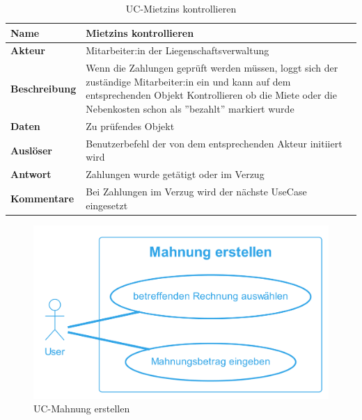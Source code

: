 \vspace*{-0.8cm}
\begin{table}[H]
  \centering
  \settowidth{}
  \setlength\extrarowheight{2pt}
  \begin{tabulary}{1.0\textwidth}{|a|m{14cm}|}
    \hline
    \textbf{Name}& Mietzins kontrollieren\\
    \hline
    \textbf{Akteur}& Mitarbeiter:in der Liegenschaftsverwaltung\\
    \hline 
    \textbf{Beschreibung} & Wenn die Zahlungen geprüft werden müssen, loggt sich der zuständige Mitarbeiter:in ein und kann auf dem entsprechenden Objekt Kontrollieren ob die Miete oder die Nebenkosten schon als ''bezahlt'' markiert wurde\\
    \hline
    \textbf{Daten} & Zu prüfendes Objekt\\
    \hline
    \textbf{Auslöser} & Benutzerbefehl der von dem entsprechenden Akteur initiiert wird\\
    \hline
    \textbf{Antwort} & Zahlungen wurde getätigt oder im Verzug\\
    \hline
    \textbf{Kommentare} & Bei Zahlungen im Verzug wird der nächste UseCase  eingesetzt\\
    \hline
  \end{tabulary}
  \caption{UC-Mietzins kontrollieren}
\end{table}

\vspace*{-0.8cm}

\begin{figure}[H]
  \begin{center}
    \includegraphics[width=0.5\linewidth]{content/diagrams/out/usecase/mahnungGenerieren/MahnungErstellen.png}
    \caption{UC-Mahnung erstellen}
    \label{mahnung}
  \end{center}
\end{figure}

